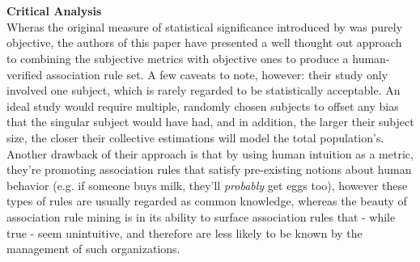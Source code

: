 \\\\\textbf{Critical Analysis}\\
Wheras the original measure of statistical significance introduced by  was purely objective, the authors  of this paper have presented a well thought out approach to combining the subjective metrics with objective ones to produce a human-verified association rule set.  A few caveats to note, however: their study only involved one subject, which is rarely regarded to be statistically acceptable. An ideal study would require multiple, randomly chosen subjects to offset any bias that the singular subject would have had, and in addition, the larger their subject size, the closer their collective estimations will model the total population's.  Another drawback of their approach is that by using human intuition as a metric,  they're promoting association rules that satisfy pre-existing notions about human behavior (e.g. if someone buys milk, they'll \textit{probably} get eggs too), however these types of rules are usually regarded as common knowledge,  whereas the beauty of association rule mining is in its ability to surface association rules that - while true - seem unintuitive, and therefore are less likely to be known by the management of such organizations.


